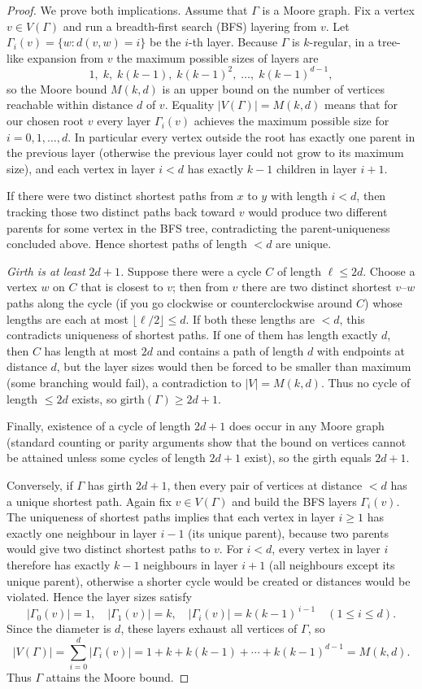 \documentclass[12pt,a4paper,openany]{book}
\begin{document}
\begin{proof}
We prove both implications. Assume that $\Gamma$ is a Moore graph. Fix a vertex $v\in V(\Gamma)$ and run a breadth-first search (BFS)
layering from $v$. Let $\Gamma_i(v)=\{w: d(v,w)=i\}$ be the $i$-th
layer. Because $\Gamma$ is $k$-regular, in a tree-like expansion from
$v$ the maximum possible sizes of layers are
\[
1,\; k,\; k(k-1),\; k(k-1)^2,\; \dots,\; k(k-1)^{d-1},
\]
so the Moore bound $M(k,d)$ is an upper bound on the number of vertices
reachable within distance $d$ of $v$. Equality $|V(\Gamma)|=M(k,d)$
means that for our chosen root $v$ every layer $\Gamma_i(v)$ achieves the
maximum possible size for $i=0,1,\dots,d$. In particular every vertex
outside the root has exactly one parent in the previous layer (otherwise
the previous layer could not grow to its maximum size), and each vertex
in layer $i<d$ has exactly $k-1$ children in layer $i+1$.

 If there were two distinct shortest paths from $x$ to $y$ with length $i<d$, then
tracking those two distinct paths back toward $v$ would produce two
different parents for some vertex in the BFS tree, contradicting the
parent-uniqueness concluded above. Hence shortest paths of length
$<d$ are unique.

\emph{Girth is at least $2d+1$.} Suppose there were a cycle $C$ of length
$\ell\le 2d$. Choose a vertex $w$ on $C$ that is closest to $v$; then
from $v$ there are two distinct shortest $v$--$w$ paths along the cycle
(if you go clockwise or counterclockwise around $C$) whose lengths are
each at most $\lfloor\ell/2\rfloor\le d$. If both these lengths are
$<d$, this contradicts uniqueness of shortest paths. If one of them has
length exactly $d$, then $C$ has length at most $2d$ and contains a
path of length $d$ with endpoints at distance $d$, but the layer sizes
would then be forced to be smaller than maximum (some branching would
fail), a contradiction to $|V|=M(k,d)$. Thus no cycle of length $\le 2d$
exists, so $\mathrm{girth}(\Gamma)\ge 2d+1$.

Finally, existence of a cycle of length $2d+1$ does occur in any Moore
graph (standard counting or parity arguments show that the bound on
vertices cannot be attained unless some cycles of length $2d+1$ exist),
so the girth equals $2d+1$.

 Conversely, if $\Gamma$ has girth $2d+1$, then every pair of vertices at distance $<d$ has a unique shortest path. Again fix $v\in V(\Gamma)$ and build the BFS layers $\Gamma_i(v)$. The
uniqueness of shortest paths implies that each vertex in layer $i\ge1$
has exactly one neighbour in layer $i-1$ (its unique parent), because
two parents would give two distinct shortest paths to $v$. For $i<d$,
every vertex in layer $i$ therefore has exactly $k-1$ neighbours in
layer $i+1$ (all neighbours except its unique parent), otherwise a
shorter cycle would be created or distances would be violated. Hence the
layer sizes satisfy
\[
|\Gamma_0(v)|=1,\quad |\Gamma_1(v)|=k,\quad |\Gamma_i(v)|=k(k-1)^{\,i-1}
\quad(1\le i\le d).
\]
Since the diameter is $d$, these layers exhaust all vertices of $\Gamma$,
so
\[
|V(\Gamma)|=\sum_{i=0}^{d} |\Gamma_i(v)| = 1 + k + k(k-1) + \cdots + k(k-1)^{d-1} = M(k,d).
\]
Thus $\Gamma$ attains the Moore bound.


\end{proof}
\end{document}
